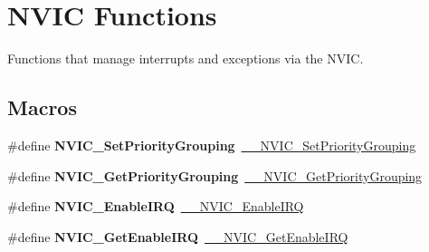 \hypertarget{group___c_m_s_i_s___core___n_v_i_c_functions}{}\section{N\+V\+IC Functions}
\label{group___c_m_s_i_s___core___n_v_i_c_functions}


Functions that manage interrupts and exceptions via the N\+V\+IC.  


\subsection*{Macros}
\begin{DoxyCompactItemize}
\item 
\mbox{\label{group___c_m_s_i_s___core___n_v_i_c_functions_ga0e798d5aec68cdd8263db86a76df788f}} 
\#define {\bfseries N\+V\+I\+C\+\_\+\+Set\+Priority\+Grouping}~\mbox{\hyperlink{group___c_m_s_i_s___core___n_v_i_c_functions_gafc94dcbaee03e4746ade1f5bb9aaa56d}{\+\_\+\+\_\+\+N\+V\+I\+C\+\_\+\+Set\+Priority\+Grouping}}
\item 
\mbox{\label{group___c_m_s_i_s___core___n_v_i_c_functions_ga4eeb9214f2264fc23c34ad5de2d3fa11}} 
\#define {\bfseries N\+V\+I\+C\+\_\+\+Get\+Priority\+Grouping}~\mbox{\hyperlink{group___c_m_s_i_s___core___n_v_i_c_functions_ga9b894af672df4373eb637f8288845c05}{\+\_\+\+\_\+\+N\+V\+I\+C\+\_\+\+Get\+Priority\+Grouping}}
\item 
\mbox{\label{group___c_m_s_i_s___core___n_v_i_c_functions_ga57b3064413dbc7459d9646020fdd8bef}} 
\#define {\bfseries N\+V\+I\+C\+\_\+\+Enable\+I\+RQ}~\mbox{\hyperlink{group___c_m_s_i_s___core___n_v_i_c_functions_ga71227e1376cde11eda03fcb62f1b33ea}{\+\_\+\+\_\+\+N\+V\+I\+C\+\_\+\+Enable\+I\+RQ}}
\item 
\mbox{\label{group___c_m_s_i_s___core___n_v_i_c_functions_ga857de13232ec65dd15087eaa15bc4a69}} 
\#define {\bfseries N\+V\+I\+C\+\_\+\+Get\+Enable\+I\+RQ}~\mbox{\hyperlink{group___c_m_s_i_s___core___n_v_i_c_functions_gaaeb5e7cc0eaad4e2817272e7bf742083}{\+\_\+\+\_\+\+N\+V\+I\+C\+\_\+\+Get\+Enable\+I\+RQ}}
\item 
\mbox{\label{group___c_m_s_i_s___core___n_v_i_c_functions_ga73b4e251f59cab4e9a5e234aac02ae57}} 

\end{DoxyCompactItemize}

